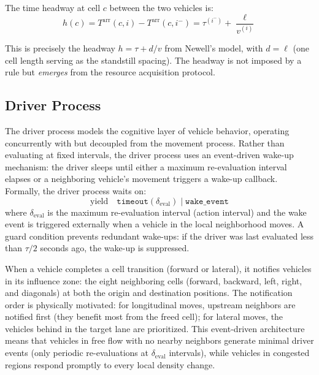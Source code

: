 \documentclass[review,authoryear]{elsarticle}
\newcommand{\Tarr}{T^{\text{arr}}}
\begin{document}
The time headway at cell $c$ between the two vehicles is:
\begin{equation}
    h(c) = \Tarr(c, i) - \Tarr(c, i^{-}) = \tau^{(i^{-})} + \frac{\ell}{v^{(i)}}
    \label{eq:headway}
\end{equation}

This is precisely the headway $h = \tau + d/v$ from Newell's model, with $d = \ell$ (one cell length serving as the standstill spacing). The headway is not imposed by a rule but \emph{emerges} from the resource acquisition protocol.

\subsection{Driver Process}
\label{sec:driver}

The driver process models the cognitive layer of vehicle behavior, operating concurrently with but decoupled from the movement process. Rather than evaluating at fixed intervals, the driver process uses an event-driven wake-up mechanism: the driver sleeps until either a maximum re-evaluation interval elapses or a neighboring vehicle's movement triggers a wake-up callback. Formally, the driver process waits on:
\begin{equation}
    \text{yield} \quad \texttt{timeout}(\delta_{\text{eval}}) \;\big|\; \texttt{wake\_event}
    \label{eq:driver_yield}
\end{equation}
where $\delta_{\text{eval}}$ is the maximum re-evaluation interval (action interval) and the wake event is triggered externally when a vehicle in the local neighborhood moves. A guard condition prevents redundant wake-ups: if the driver was last evaluated less than $\tau/2$ seconds ago, the wake-up is suppressed.

When a vehicle completes a cell transition (forward or lateral), it notifies vehicles in its influence zone: the eight neighboring cells (forward, backward, left, right, and diagonals) at both the origin and destination positions. The notification order is physically motivated: for longitudinal moves, upstream neighbors are notified first (they benefit most from the freed cell); for lateral moves, the vehicles behind in the target lane are prioritized. This event-driven architecture means that vehicles in free flow with no nearby neighbors generate minimal driver events (only periodic re-evaluations at $\delta_{\text{eval}}$ intervals), while vehicles in congested regions respond promptly to every local density change.
\end{document}
